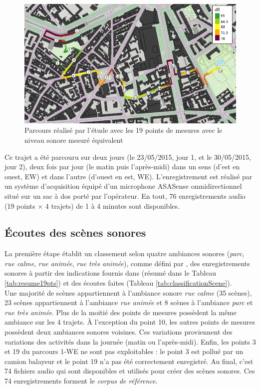 \begin{figure}[hbtp]
\centering
\includegraphics[width=.7\textwidth]{./figures/grafic/trajet_19pts.png}
\caption{Parcours réalisé par l'étude avec les 19 points de mesures avec le niveau sonore mesuré équivalent}
\label{fig:parcoursGRAFIC}
\end{figure}

Ce trajet a été parcouru sur deux jours (le 23/05/2015, jour 1, et le 30/05/2015, jour 2), deux fois par jour (le matin puis l'après-midi) dans un sens (d'est en ouest, EW) et dans l'autre (d'ouest en est, WE). L'enregistrement est réalisé par un système d'acquisition équipé d'un microphone ASASense omnidirectionnel situé sur un sac à dos porté par l'opérateur. En tout, 76 enregistrements audio (19 points $\times$ 4 trajets) de 1 à 4 minutes sont disponibles. \\




\subsection{Écoutes des scènes sonores}

La première étape établit un classement selon quatre ambiances sonores (\textit{parc}, \textit{rue calme}, \textit{rue animée}, \textit{rue très animée}), comme défini par \cite{can_describing_2015}, des enregistrements sonores à partir des indications fournis dans \cite{aumond2017modeling} (résumé dans le Tableau \ref{tab:resume19pts}) et des écoutes faites  (Tableau \ref{tab:classificationScene}).\\



Une majorité de scènes appartiennent à l'ambiance sonore \textit{rue calme} (35 scènes), 23 scènes appartiennent à l'ambiance \textit{rue animée} et 8 scènes à l'ambiance \textit{parc} et \textit{rue très animée}. Plus de la moitié des points de mesures possèdent la même ambiance sur les 4 trajets. À l'exception du point 10, les autres points de mesures possèdent deux ambiances sonores voisines. Ces variations proviennent des variations des activités dans la journée (matin ou l'après-midi). Enfin, les points 3 et 19 du parcours 1-WE ne sont pas exploitables : le point 3 est pollué par un camion balayeur et le point 19 n'a pas été correctement enregistré. Au final, c'est 74 fichiers audio qui sont disponibles et utilisés pour créer des scènes sonores. Ces 74 enregistrements forment le \textit{corpus de référence}.

